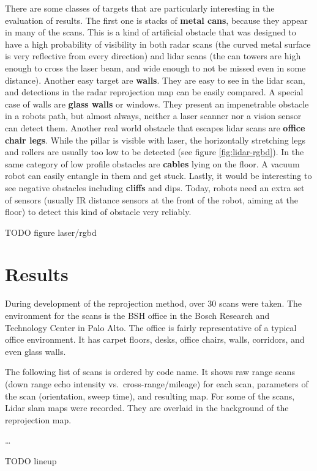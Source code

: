 There are some classes of targets that are particularly interesting in the evaluation of results. The first one is stacks of \textbf{metal cans}, because they appear in many of the scans. This is a kind of artificial obstacle that was designed to have a high probability of visibility in both radar scans (the curved metal surface is very reflective from every direction) and lidar scans (the can towers are high enough to cross the laser beam, and wide enough to not be missed even in some distance). Another easy target are \textbf{walls}. They are easy to see in the lidar scan, and detections in the radar reprojection map can be easily compared. A special case of walls are \textbf{glass walls} or windows. They present an impenetrable obstacle in a robots path, but almost always, neither a laser scanner nor a vision sensor can detect them. Another real world obstacle that escapes lidar scans are \textbf{office chair legs}. While the pillar is visible with laser, the horizontally stretching legs and rollers are usually too low to be detected (see figure \cref{fig:lidar-rgbd}). In the same category of low profile obstacles are \textbf{cables} lying on the floor. A vacuum robot can easily entangle in them and get stuck. Lastly, it would be interesting to see negative obstacles including \textbf{cliffs} and dips. Today, robots need an extra set of sensors (usually IR distance sensors at the front of the robot, aiming at the floor) to detect this kind of obstacle very reliably.

TODO figure laser/rgbd

\section{Results}\label{results}

During development of the reprojection method, over 30 scans were taken.
The environment for the scans is the BSH office in the Bosch Research
and Technology Center in Palo Alto. The office is fairly representative
of a typical office environment. It has carpet floors, desks, office
chairs, walls, corridors, and even glass walls.

The following list of scans is ordered by code name. It shows raw range
scans (down range echo intensity vs.~cross-range/mileage) for each scan,
parameters of the scan (orientation, sweep time), and resulting map. For
some of the scans, Lidar slam maps were recorded. They are overlaid in
the background of the reprojection map.

\ldots{}

TODO lineup